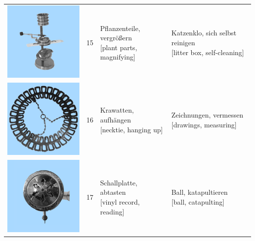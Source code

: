 \documentclass[
  english,
  man,floatsintext]{apa7}
\begin{document}
\begin{center}
\begin{ThreePartTable}
{\begin{longtable}{llll}
\includegraphics[valign=c, scale=0.23]{../materials/unfamiliar/15.png} & 15 & \makecell[l]{Pflanzenteile, vergrößern\\{[plant parts, magnifying]}} & \makecell[l]{Katzenklo, sich selbst reinigen\\{[litter box, self-cleaning]}}\\
\includegraphics[valign=c, scale=0.23]{../materials/unfamiliar/16.png} & 16 & \makecell[l]{Krawatten, aufhängen\\{[necktie, hanging up]}} & \makecell[l]{Zeichnungen, vermessen\\{[drawings, measuring]}}\\
\includegraphics[valign=c, scale=0.23]{../materials/unfamiliar/17.png} & 17 & \makecell[l]{Schallplatte, abtasten\\{[vinyl record, reading]}} & \makecell[l]{Ball, katapultieren\\{[ball, catapulting]}}\\

\end{longtable}}
\end{ThreePartTable}
\end{center}
\end{document}
